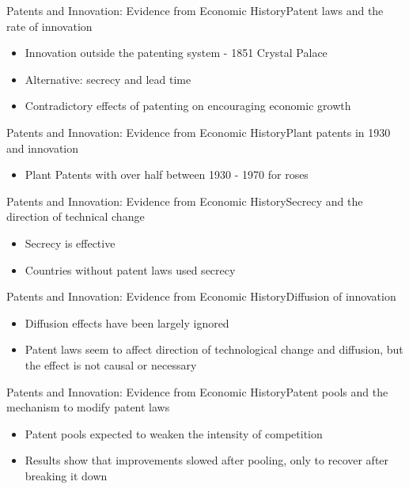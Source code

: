 \documentclass{beamer}
\begin{document}
\begin{frame}{Patents and Innovation: Evidence from Economic History}{Patent laws and the rate of innovation}
\begin{itemize}
\item{Innovation outside the patenting system - 1851 Crystal Palace}
\item{Alternative: secrecy and lead time}
\item{Contradictory effects of patenting on encouraging economic growth}
\end{itemize}
\end{frame}

\begin{frame}{Patents and Innovation: Evidence from Economic History}{Plant patents in 1930 and innovation}
\begin{itemize}
\item{Plant Patents with over half between 1930 - 1970 for roses}
\end{itemize}
\end{frame}

\begin{frame}{Patents and Innovation: Evidence from Economic History}{Secrecy and the direction of technical change}
\begin{itemize}
\item{Secrecy is effective}
\item{Countries without patent laws used secrecy}
\end{itemize}
\end{frame}

\begin{frame}{Patents and Innovation: Evidence from Economic History}{Diffusion of innovation}
\begin{itemize}
\item{Diffusion effects have been largely ignored}
\item{Patent laws seem to affect direction of technological change and diffusion, but the effect is not causal or necessary}
\end{itemize}
\end{frame}

\begin{frame}{Patents and Innovation: Evidence from Economic History}{Patent pools and the mechanism to modify patent laws}
\begin{itemize}
\item{Patent pools expected to weaken the intensity of competition}
\item{Results show that improvements slowed after pooling, only to recover after breaking it down}
\end{itemize}
\end{frame}
\end{document}

